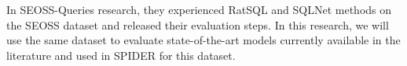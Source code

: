 In SEOSS-Queries\cite{TOMOVA2022108211} research, they experienced RatSQL and SQLNet methods on the SEOSS dataset and released their evaluation steps. In this research, we will use the same dataset to evaluate state-of-the-art models currently available in the literature and used in SPIDER for this dataset.

